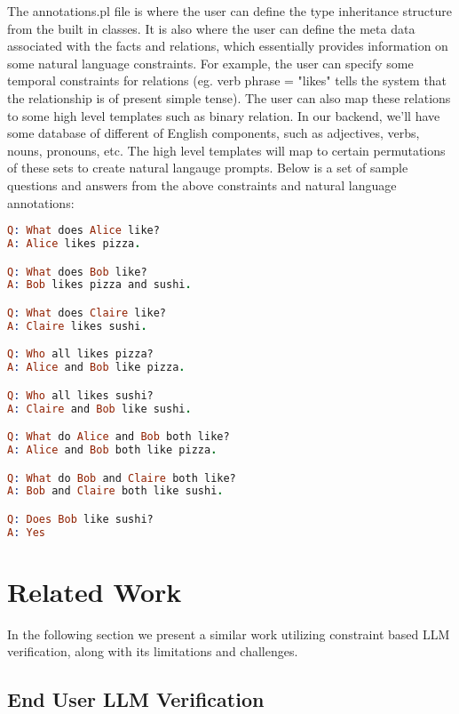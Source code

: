 \documentclass{article}
\begin{document}
The annotations.pl file is where the user can define the type inheritance structure from the built in classes.  It is also where the user can define the meta data associated with the
facts and relations, which essentially provides information on some natural language constraints.  For example, the user can specify some temporal constraints for relations (eg. verb phrase = "likes" tells the system that the relationship is of present simple tense).
The user can also map these relations to some high level templates such as binary relation.  In our backend, we'll have some database of different of English components, such as adjectives, verbs, nouns, pronouns, etc.  The high level templates will map to certain permutations of these sets to create natural langauge 
prompts.  Below is a set of sample questions and answers from the above constraints and natural language annotations:


\noindent
{}
\begin{lstlisting}[language=Prolog]
Q: What does Alice like?
A: Alice likes pizza.

Q: What does Bob like?
A: Bob likes pizza and sushi.

Q: What does Claire like?
A: Claire likes sushi.

Q: Who all likes pizza?
A: Alice and Bob like pizza.

Q: Who all likes sushi?
A: Claire and Bob like sushi.

Q: What do Alice and Bob both like?
A: Alice and Bob both like pizza.

Q: What do Bob and Claire both like?
A: Bob and Claire both like sushi.

Q: Does Bob like sushi?
A: Yes
\end{lstlisting}

\section{Related Work}
\label{gen_inst}

In the following section we present a similar work utilizing constraint based LLM verification, along with its limitations and challenges.

\subsection{End User LLM Verification}
\end{document}
